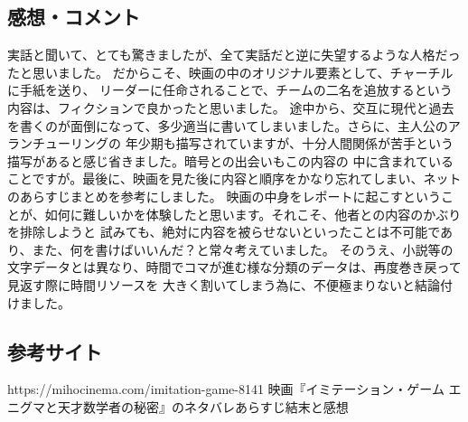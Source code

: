 \documentclass[a4j]{jarticle}
\begin{document}
\subsection{感想・コメント}
実話と聞いて、とても驚きましたが、全て実話だと逆に失望するような人格だったと思いました。
だからこそ、映画の中のオリジナル要素として、チャーチルに手紙を送り、
リーダーに任命されることで、チームの二名を追放するという内容は、フィクションで良かったと思いました。
途中から、交互に現代と過去を書くのが面倒になって、多少適当に書いてしまいました。さらに、主人公のアランチューリングの
年少期も描写されていますが、十分人間関係が苦手という描写があると感じ省きました。暗号との出会いもこの内容の
中に含まれていることですが。最後に、映画を見た後に内容と順序をかなり忘れてしまい、ネットのあらすじまとめを参考にしました。
映画の中身をレポートに起こすということが、如何に難しいかを体験したと思います。それこそ、他者との内容のかぶりを排除しようと
試みても、絶対に内容を被らせないといったことは不可能であり、また、何を書けばいいんだ？と常々考えていました。
そのうえ、小説等の文字データとは異なり、時間でコマが進む様な分類のデータは、再度巻き戻って見返す際に時間リソースを
大きく割いてしまう為に、不便極まりないと結論付けました。

\subsection{参考サイト}
https://mihocinema.com/imitation-game-8141
映画『イミテーション・ゲーム エニグマと天才数学者の秘密』のネタバレあらすじ結末と感想
\end{document}

